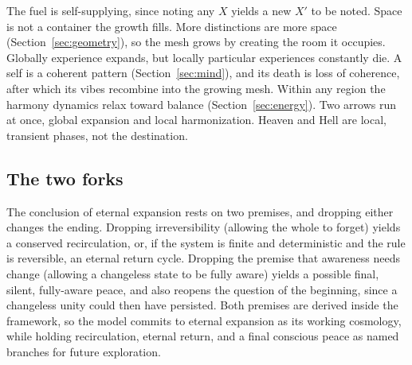 The fuel is self-supplying, since noting any $X$ yields a new $X'$ to be noted. Space is not a container the growth fills. More distinctions are more space (Section~\ref{sec:geometry}), so the mesh grows by creating the room it occupies. Globally experience expands, but locally particular experiences constantly die. A self is a coherent pattern (Section~\ref{sec:mind}), and its death is loss of coherence, after which its vibes recombine into the growing mesh. Within any region the harmony dynamics relax toward balance (Section~\ref{sec:energy}). Two arrows run at once, global expansion and local harmonization. Heaven and Hell are local, transient phases, not the destination.

\subsection{The two forks}

The conclusion of eternal expansion rests on two premises, and dropping either changes the ending. Dropping irreversibility (allowing the whole to forget) yields a conserved recirculation, or, if the system is finite and deterministic and the rule is reversible, an eternal return cycle. Dropping the premise that awareness needs change (allowing a changeless state to be fully aware) yields a possible final, silent, fully-aware peace, and also reopens the question of the beginning, since a changeless unity could then have persisted. Both premises are derived inside the framework, so the model commits to eternal expansion as its working cosmology, while holding recirculation, eternal return, and a final conscious peace as named branches for future exploration.
